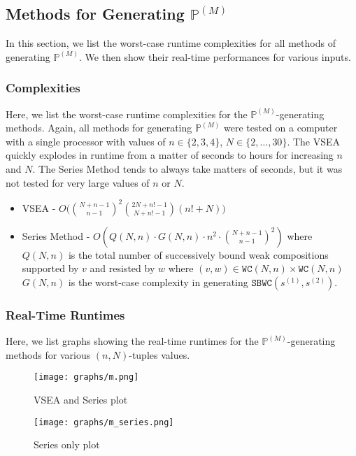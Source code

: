 \documentclass{article}
\begin{document}
\subsection{Methods for Generating $\mathbb{P}^{(M)}$}
In this section, we list the worst-case runtime complexities for all methods of generating $\mathbb{P}^{(M)}$. We then show their real-time performances for various inputs.

\subsubsection{Complexities}
Here, we list the worst-case runtime complexities for the $\mathbb{P}^{(M)}$-generating methods. Again, all methods for generating $\mathbb{P}^{(M)}$ were tested on a computer with a single processor with values of $n \in \{2,3,4\}$, $N \in \{2, \dots, 30\}$. The VSEA quickly explodes in runtime from a matter of seconds to hours for increasing $n$ and $N$. The Series Method tends to always take matters of seconds, but it was not tested for very large values of $n$ or $N$.

\begin{itemize}
    \item VSEA - $O\bigg( {N+n-1 \choose n-1}^2 {2N+n!-1 \choose N+n!-1} (n! + N) \bigg)$
    \item Series Method - $O(Q(N,n) \cdot G(N,n) \cdot n^2 \cdot {N+n-1 \choose n-1}^2 )$ where $Q(N,n)$ is the total number of successively bound weak compositions supported by $v$ and resisted by $w$ where $(v,w) \in \texttt{WC}(N,n) \times \texttt{WC}(N,n)$ $G(N,n)$ is the worst-case complexity in generating $\texttt{SBWC}(s^{(1)}, s^{(2)})$.
\end{itemize}

\subsubsection{Real-Time Runtimes}
Here, we list graphs showing the real-time runtimes for the $\mathbb{P}^{(M)}$-generating methods for various $(n,N)$-tuples values.

\begin{center}
    \begin{figure}[!h]
      \centering
      \texttt{[image: graphs/m.png]}
      \caption{VSEA and Series plot}
      \label{fig:m}
    \end{figure}

    \begin{figure}[!h]
      \centering
      \texttt{[image: graphs/m\_series.png]}
      \caption{Series only plot}
      \label{fig:series}
    \end{figure}
\end{center}
\end{document}
